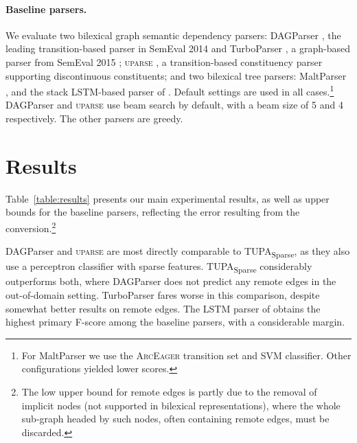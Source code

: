 \documentclass[11pt,a4paper]{article}
\newcommand{\parser}[1]{TUPA\textsubscript{#1}}
\newcommand{\tabref}[1]{Table~\ref{#1}}
\begin{document}
\paragraph{Baseline parsers.}
We evaluate two bilexical graph semantic dependency parsers:
DAGParser \cite{ribeyre-villemontedelaclergerie-seddah:2014:SemEval}, the leading 
transition-based parser in SemEval 2014 \cite{oepen2014semeval} and
TurboParser \cite{almeida-martins:2015:SemEval},
a graph-based parser from SemEval 2015 
\cite{oepen2015semeval};
\textsc{uparse} \cite{maier-lichte:2016:DiscoNLP},
a transition-based constituency parser supporting discontinuous constituents;
and two bilexical tree parsers:
MaltParser \cite{nivre2007maltparser},
and the stack LSTM-based parser of
\citet[henceforce ``LSTM Parser'']{dyer2015transition}.
Default settings are used in all cases.\footnote{For
MaltParser we use the \textsc{ArcEager} transition set and SVM classifier.
Other configurations yielded lower scores.}
DAGParser and \textsc{uparse} use beam search by default, with a beam size of 5 and 4
respectively. The other parsers are greedy.



\section{Results}\label{sec:results}

\tabref{table:results} presents our main experimental results, as well as
upper bounds for the baseline parsers,
reflecting the error resulting from the conversion.\footnote{The low
upper bound for remote edges is partly due to the removal of implicit nodes (not supported
in bilexical representations), where the whole sub-graph headed by such nodes,
often containing remote edges, must be discarded.}

DAGParser and \textsc{uparse} are most directly comparable to
\parser{Sparse}, as they also use a perceptron classifier with sparse features.
\parser{Sparse} considerably outperforms both, where
DAGParser does not predict any remote edges in the out-of-domain setting.
TurboParser fares worse in this comparison, despite somewhat better results on
remote edges.
The LSTM parser of \citet{dyer2015transition} obtains the highest primary F-score
among the baseline parsers, with a considerable margin.
\end{document}
